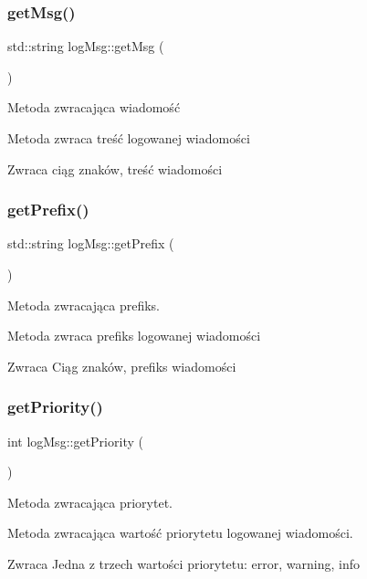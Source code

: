 \subsubsection{\texorpdfstring{get\+Msg()}{getMsg()}}
{\footnotesize\ttfamily std\+::string log\+Msg\+::get\+Msg (\begin{DoxyParamCaption}{ }\end{DoxyParamCaption})}



Metoda zwracająca wiadomość 

Metoda zwraca treść logowanej wiadomości \begin{DoxyReturn}{Zwraca}
ciąg znaków, treść wiadomości 
\end{DoxyReturn}
\mbox{\label{classlog_msg_af10adb316ec6ba7bd7db5b4c0c5de365}} 
\subsubsection{\texorpdfstring{get\+Prefix()}{getPrefix()}}
{\footnotesize\ttfamily std\+::string log\+Msg\+::get\+Prefix (\begin{DoxyParamCaption}{ }\end{DoxyParamCaption})}



Metoda zwracająca prefiks. 

Metoda zwraca prefiks logowanej wiadomości \begin{DoxyReturn}{Zwraca}
Ciąg znaków, prefiks wiadomości 
\end{DoxyReturn}
\mbox{\label{classlog_msg_a631e3b2a26f15c3b39b0718bcf3c3a57}} 
\subsubsection{\texorpdfstring{get\+Priority()}{getPriority()}}
{\footnotesize\ttfamily int log\+Msg\+::get\+Priority (\begin{DoxyParamCaption}{ }\end{DoxyParamCaption})}



Metoda zwracająca priorytet. 

Metoda zwracająca wartość priorytetu logowanej wiadomości. \begin{DoxyReturn}{Zwraca}
Jedna z trzech wartości priorytetu\+: error, warning, info 
\end{DoxyReturn}
\mbox{\label{classlog_msg_a43ba149c673ff7b4070ec5308809ccf0}} 
